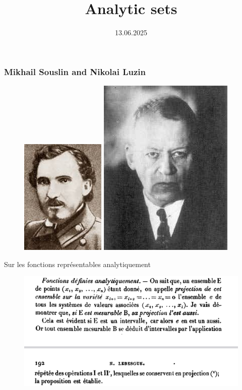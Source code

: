 \documentclass{beamer}
\title{Analytic sets}
\date{13.06.2025}
\numberwithin{equation}{section}
\begin{document}
\frame{\titlepage}

\begin{frame}
\frametitle{Mikhail Souslin and Nikolai Luzin}
\begin{figure}[h]
		\includegraphics[width = 0.45\linewidth]{souslin}
		\includegraphics[width = 0.465\linewidth]{luzin}
\end{figure}
\end{frame}

\begin{frame}{Sur les fonctions représentables analytiquement}
	\begin{figure}
		\includegraphics[width = 0.9\linewidth]{lebesgue_lemma}
	\end{figure}
	
\end{frame}
\end{document}

